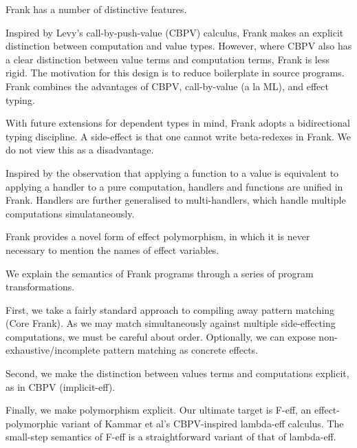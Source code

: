 \documentclass[preprint]{sigplanconf}
\begin{document}
Frank has a number of distinctive features.

Inspired by Levy's call-by-push-value (CBPV) calculus, Frank makes an
explicit distinction between computation and value types. However,
where CBPV also has a clear distinction between value terms and
computation terms, Frank is less rigid. The motivation for this design
is to reduce boilerplate in source programs. Frank combines the
advantages of CBPV, call-by-value (a la ML), and effect typing.

With future extensions for dependent types in mind, Frank adopts a
bidirectional typing discipline. A side-effect is that one cannot
write beta-redexes in Frank. We do not view this as a disadvantage.

Inspired by the observation that applying a function to a value is
equivalent to applying a handler to a pure computation, handlers and
functions are unified in Frank. Handlers are further generalised to
multi-handlers, which handle multiple computations simulataneously.

Frank provides a novel form of effect polymorphism, in which it is
never necessary to mention the names of effect variables.

We explain the semantics of Frank programs through a series of program
transformations.

First, we take a fairly standard approach to compiling away pattern
matching (Core Frank). As we may match simultaneously against multiple
side-effecting computations, we must be careful about
order. Optionally, we can expose non-exhaustive/incomplete pattern
matching as concrete effects.

Second, we make the distinction between values terms and computations
explicit, as in CBPV (implicit-eff).

Finally, we make polymorphism explicit. Our ultimate target is F-eff,
an effect-polymorphic variant of Kammar et al's CBPV-inspired
lambda-eff calculus. The small-step semantics of F-eff is a
straightforward variant of that of lambda-eff.
\end{document}
